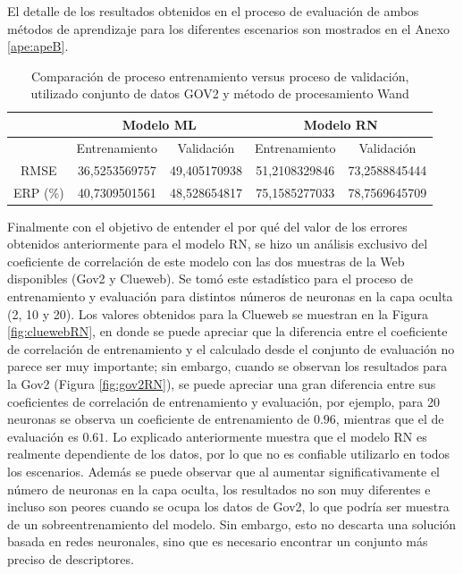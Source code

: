 El detalle de los resultados obtenidos en el proceso de evaluación de ambos métodos de aprendizaje para los diferentes escenarios son mostrados en el Anexo \ref{ape:apeB}.

\begin{table}[tp]
\caption{Comparación de proceso entrenamiento versus proceso de validación, utilizado conjunto de datos GOV2 y método de procesamiento Wand}
\begin{center}
\begin{tabular}{|c|c|c|c|c|}
\hline
 & \multicolumn{ 2}{c|}{Modelo ML} & \multicolumn{ 2}{c|}{Modelo RN } \\ \hline
 & Entrenamiento & Validación & Entrenamiento & Validación \\ \hline
RMSE & 36,5253569757 & 49,405170938 & 51,2108329846 & 73,2588845444 \\ \hline
ERP (\%) & 40,7309501561 & 48,528654817 & 75,1585277033 & 78,7569645709 \\ \hline
\end{tabular}
\end{center}
\label{validacion_modelos_gov2_wand}
\end{table}

Finalmente con el objetivo de entender el por qué del valor de los errores obtenidos anteriormente para el modelo RN, se hizo un análisis exclusivo del coeficiente de correlación de este modelo con las dos muestras de la Web disponibles (Gov2 y Clueweb). Se tomó este estadístico para el proceso de entrenamiento y evaluación para distintos números de neuronas en la capa oculta (2, 10 y 20). Los valores obtenidos para la Clueweb se muestran en la Figura \ref{fig:cluewebRN}, en donde se puede apreciar que la diferencia entre el coeficiente de correlación de entrenamiento y el calculado desde el conjunto de evaluación no parece ser muy importante; sin embargo, cuando se observan los resultados para la Gov2 (Figura \ref{fig:gov2RN}), se puede apreciar una gran diferencia entre sus coeficientes de correlación de entrenamiento y evaluación, por ejemplo, para 20 neuronas se observa un coeficiente de entrenamiento de $0.96$, mientras que el de evaluación es $0.61$. Lo explicado anteriormente muestra que el modelo RN es realmente dependiente de los datos, por lo que no es confiable utilizarlo en todos los escenarios. Además se puede observar que al aumentar significativamente el número de neuronas en la capa oculta, los resultados no son muy diferentes e incluso son peores cuando se ocupa los datos de Gov2, lo que podría ser muestra de un sobreentrenamiento del modelo. Sin embargo, esto no descarta una solución basada en redes neuronales, sino que es necesario encontrar un conjunto más preciso de descriptores.

